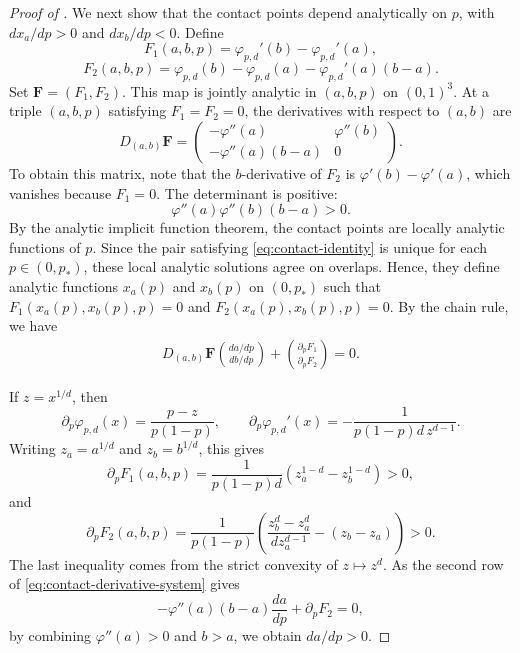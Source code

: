 \begin{proof}[Proof of ]
We next show that the contact points depend analytically on $p$, with
$dx_a/dp>0$ and $dx_b/dp<0$.
Define
\[
  F_1(a,b,p)=\varphi_{p,d}'(b)-\varphi_{p,d}'(a),
\]
\[
  F_2(a,b,p)=
  \varphi_{p,d}(b)-\varphi_{p,d}(a)-\varphi_{p,d}'(a)(b-a).
\]
Set $\mathbf F=(F_1,F_2)$.  This map is jointly analytic in $(a,b,p)$ on
$(0,1)^3$.  At a triple $(a,b,p)$ satisfying $F_1=F_2=0$, the derivatives
with respect to $(a,b)$ are
\[
  D_{(a,b)}\mathbf F=
  \begin{pmatrix}
    -\varphi''(a)&\varphi''(b)\\
    -\varphi''(a)(b-a)&0
  \end{pmatrix}.
\]
To obtain this matrix, note that the $b$-derivative of $F_2$ is
$\varphi'(b)-\varphi'(a)$, which
vanishes because $F_1=0$.  The determinant is positive:
\[
  \varphi''(a)\varphi''(b)(b-a)>0.
\]
By the analytic implicit function theorem, the contact points are locally
analytic functions of $p$.  Since the pair satisfying
\eqref{eq:contact-identity} is unique for each
$p\in(0,p_*)$, these local analytic solutions agree on overlaps.  Hence, they
define analytic functions $x_a(p)$ and $x_b(p)$ on $(0,p_*)$ such that
$F_1(x_a(p),x_b(p),p)=0$ and
$F_2(x_a(p),x_b(p),p)=0$.
By the chain rule, we have
\begin{align}
  D_{(a,b)}\mathbf F
  \binom{da/dp}{db/dp}
  +
  \binom{\partial_pF_1}{\partial_pF_2}
  =0. \label{eq:contact-derivative-system}
\end{align}

If $z=x^{1/d}$, then
\[
  \partial_p\varphi_{p,d}(x)=\frac{p-z}{p(1-p)},
  \qquad
  \partial_p\varphi_{p,d}'(x)=
  -\frac1{p(1-p)d\,z^{d-1}}.
\]
Writing $z_a=a^{1/d}$ and $z_b=b^{1/d}$, this gives
\[
  \partial_pF_1(a,b,p)
  =
  \frac1{p(1-p)d}\left(z_a^{1-d}-z_b^{1-d}\right)>0,
\]
and
\[
  \partial_pF_2(a,b,p)
  =
  \frac1{p(1-p)}
  \left(\frac{z_b^d-z_a^d}{d z_a^{d-1}}-(z_b-z_a)\right)>0.
\]
The last inequality comes from the strict convexity of $z\mapsto z^d$.
As the second row of \eqref{eq:contact-derivative-system} gives
\[
  -\varphi''(a)(b-a)\frac{da}{dp}+\partial_pF_2=0,
\]
by combining $\varphi''(a)>0$ and $b>a$, we obtain $da/dp>0$.


\end{proof}
